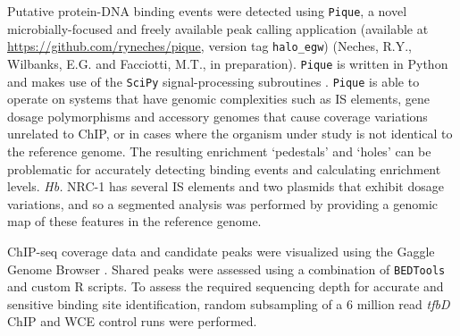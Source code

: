 Putative protein-DNA binding events were detected using {\tt Pique}, a novel microbially-focused and freely available peak calling application (available at \url{https://github.com/ryneches/pique}, version tag {\tt halo\_egw}) (Neches, R.Y., Wilbanks, E.G. and Facciotti, M.T., in preparation). {\tt Pique} is written in Python and makes use of the {\tt SciPy} signal-processing subroutines \cite{scipy}. {\tt Pique} is able to operate on systems that have genomic complexities such as IS elements, gene dosage polymorphisms and accessory genomes that cause coverage variations unrelated to ChIP, or in cases where the organism under study is not identical to the reference genome. The resulting enrichment `pedestals' and `holes' can be problematic for accurately detecting binding events and calculating enrichment levels. {\em Hb.} NRC-1 has several IS elements and two plasmids that exhibit dosage variations, and so a segmented analysis was performed by providing a genomic map of these features in the reference genome.

ChIP-seq coverage data and candidate peaks were visualized using the Gaggle Genome Browser \cite{bare_integration_2010}. Shared peaks were assessed using a combination of {\tt BEDTools} \cite{quinlan2010bedtools} and custom R scripts. To assess the required sequencing depth for accurate and sensitive binding site identification, random subsampling of a 6 million read  {\em tfbD}  ChIP and WCE control runs were performed.
